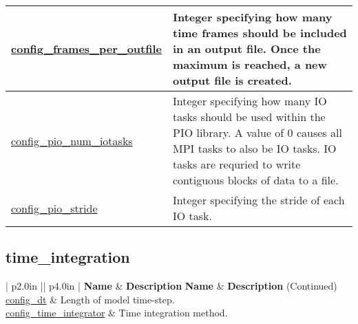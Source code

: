 {\begin{center}
\begin{longtable}{| p{2.0in} || p{4.0in} |}
	\hline
	\hyperref[sec:nm_sec_config_frames_per_outfile]{config\_frames\_per\_outfile} & Integer specifying how many time frames should be included in an output file. Once the maximum is reached, a new output file is created. \\
	\hline
	\hyperref[sec:nm_sec_config_pio_num_iotasks]{config\_pio\_num\_iotasks} & Integer specifying how many IO tasks should be used within the PIO library. A value of 0 causes all MPI tasks to also be IO tasks. IO tasks are requried to write contiguous blocks of data to a file. \\
	\hline
	\hyperref[sec:nm_sec_config_pio_stride]{config\_pio\_stride} & Integer specifying the stride of each IO task. \\
	\hline
\end{longtable}
\end{center}
}
\subsection[time\_integration]{time\_integration}
\label{subsec:forward_nm_tab_time_integration}

\vspace{0.5in}
{\small
\begin{center}
\begin{longtable}{| p{2.0in} || p{4.0in} |}
	\hline
	{\bf Name} & {\bf Description} \endfirsthead
	\hline 
	{\bf Name} & {\bf Description} (Continued) \endhead
	\hline
	\hline
	\hyperref[sec:nm_sec_config_dt]{config\_dt} & Length of model time-step. \\
	\hline
	\hyperref[sec:nm_sec_config_time_integrator]{config\_time\_integrator} & Time integration method. \\
	\hline
\end{longtable}
\end{center}
}
